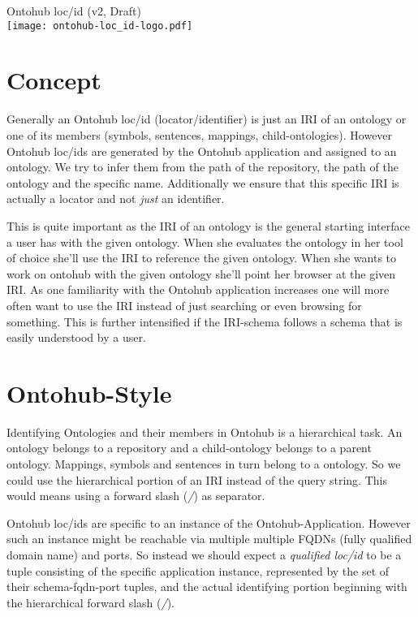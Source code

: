 \documentclass[a4paper,11pt,DIV=22]{scrartcl}
\author{Tim Reddehase}
\date{2015-02-22}
\begin{document}
\Huge
\begin{center}
  Ontohub loc/id (v2, Draft)\\
  \bigskip
  \texttt{[image: ontohub-loc\_id-logo.pdf]}
\end{center}
\normalsize

\bigskip

\section{Concept}

Generally an Ontohub loc/id (locator/identifier) is just an IRI of an ontology
or one of its members (symbols, sentences, mappings, child-ontologies). However
Ontohub loc/ids are generated by the Ontohub application and assigned to an
ontology.  We try to infer them from the path of the repository, the path of
the ontology and the specific name. Additionally we ensure that this specific
IRI is actually a locator and not \emph{just} an identifier.

This is quite important as the IRI of an ontology is the general starting
interface a user has with the given ontology. When she evaluates the ontology
in her tool of choice she'll use the IRI to reference the given ontology. When
she wants to work on ontohub with the given ontology she'll point her browser
at the given IRI. As one familiarity with the Ontohub application increases one
will more often want to use the IRI instead of just searching or even browsing
for something.  This is further intensified if the IRI-schema follows a schema
that is easily understood by a user.

\section{Ontohub-Style}

Identifying Ontologies and their members in Ontohub is a hierarchical task. An
ontology belongs to a repository and a child-ontology belongs to a parent
ontology. Mappings, symbols and sentences in turn belong to a ontology. So we
could use the hierarchical portion of an IRI instead of the query string.
This would means using a forward slash (\emph{/}) as separator.

Ontohub loc/ids are specific to an instance of the Ontohub-Application. However
such an instance might be reachable via multiple multiple FQDNs (fully
qualified domain name) and ports. So instead we should expect a
\emph{qualified loc/id} to be a tuple consisting of the specific application
instance, represented by the set of their schema-fqdn-port tuples, and the
actual identifying portion beginning with the hierarchical forward slash
(\emph{/}).
\end{document}
